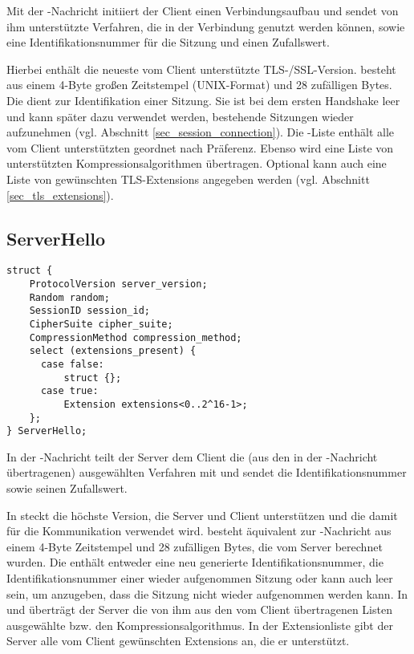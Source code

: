 Mit der \clienthello{}-Nachricht initiiert der Client einen Verbindungsaufbau und sendet von ihm unterstützte Verfahren, die in der Verbindung genutzt werden können, sowie eine Identifikationsnummer für die Sitzung und einen Zufallswert.

Hierbei enthält  die neueste vom Client unterstützte TLS-/SSL-Version. 
 besteht aus einem 4-Byte großen Zeitstempel (UNIX-Format) und 28 zufälligen Bytes. 
Die  dient zur Identifikation einer Sitzung. Sie ist bei dem ersten Handshake leer und kann später dazu verwendet werden, bestehende Sitzungen wieder aufzunehmen (vgl. Abschnitt \ref{sec_session_connection}). 
Die \ciphersuite{}-Liste enthält alle vom Client unterstützten \ciphersuites{} geordnet nach Präferenz. 
Ebenso wird eine Liste von unterstützten Kompressionsalgorithmen übertragen. 
Optional kann auch eine Liste von gewünschten TLS-Extensions angegeben werden (vgl. Abschnitt \ref{sec_tls_extensions}).

\subsection{ServerHello}

\begin{lstlisting}
struct {
	ProtocolVersion server_version;
	Random random;
	SessionID session_id;
	CipherSuite cipher_suite;
	CompressionMethod compression_method;
	select (extensions_present) {
	  case false:
	      struct {};
	  case true:
	      Extension extensions<0..2^16-1>;
	};
} ServerHello;
\end{lstlisting}

In der \serverhello{}-Nachricht teilt der Server dem Client die (aus den in der \clienthello{}-Nachricht übertragenen) ausgewählten Verfahren mit und sendet die Identifikationsnummer sowie seinen Zufallswert.

In  steckt die höchste Version, die Server und Client unterstützen und die damit für die Kommunikation verwendet wird.  besteht äquivalent zur \clienthello{}-Nachricht aus einem 4-Byte Zeitstempel und 28 zufälligen Bytes, die vom Server berechnet wurden. Die  enthält entweder eine neu generierte Identifikationsnummer, die Identifikationsnummer einer wieder aufgenommen Sitzung oder kann auch leer sein, um anzugeben, dass die Sitzung nicht wieder aufgenommen werden kann. In  und  überträgt der Server die von ihm aus den vom Client übertragenen Listen ausgewählte \ciphersuite{} bzw. den Kompressionsalgorithmus. In der Extensionliste gibt der Server alle vom Client gewünschten Extensions an, die er unterstützt.

